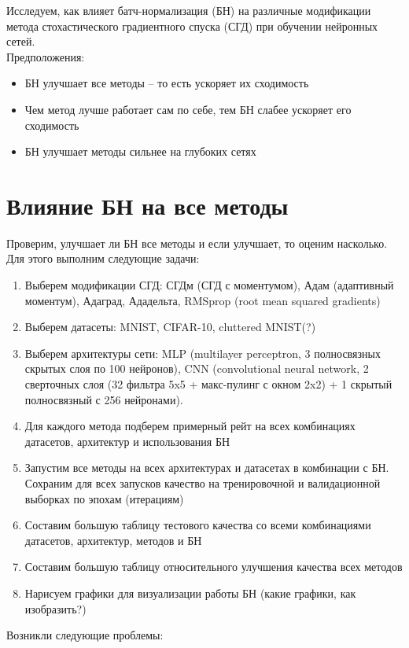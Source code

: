 \documentclass[12pt,oneside]{article}
\begin{document}
Исследуем, как влияет батч-нормализация (БН) на различные модификации метода стохастического градиентного спуска (СГД) при обучении нейронных сетей.\\

Предположения:
\begin{itemize}
\item БН улучшает все методы -- то есть ускоряет их сходимость
\item Чем метод лучше работает сам по себе, тем БН слабее ускоряет его сходимость
\item БН улучшает методы сильнее на глубоких сетях
\end{itemize}

\section{Влияние БН на все методы}

Проверим, улучшает ли БН все методы и если улучшает, то оценим насколько. Для этого выполним следующие задачи:

\begin{enumerate}
\item Выберем модификации СГД: СГДм (СГД с моментумом), Адам (адаптивный моментум), Адаград, Ададельта, RMSprop (root mean squared gradients)
\item Выберем датасеты: MNIST, CIFAR-10, cluttered MNIST(?)
\item Выберем архитектуры сети: MLP (multilayer perceptron, 3 полносвязных скрытых слоя по 100 нейронов), CNN (convolutional neural network, 2 сверточных слоя (32 фильтра 5x5 + макс-пулинг с окном 2x2) + 1 скрытый полносвязный с 256 нейронами). 
\item Для каждого метода подберем примерный рейт на всех комбинациях датасетов, архитектур и использования БН
\item Запустим все методы на всех архитектурах и датасетах в комбинации с БН. Сохраним для всех запусков качество на тренировочной и валидационной выборках по эпохам (итерациям)
\item Составим большую таблицу тестового качества со всеми комбинациями датасетов, архитектур, методов и БН
\item Составим большую таблицу относительного улучшения качества всех методов
\item Нарисуем графики для визуализации работы БН (какие графики, как изобразить?)
\end{enumerate}

Возникли следующие проблемы:
\end{document}
